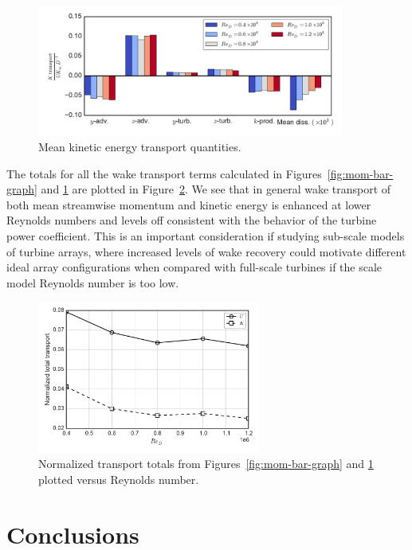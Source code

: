 \documentclass[energies,article,accept,moreauthors,pdftex,12pt,a4paper]{mdpi}
\begin{document}
\begin{figure}[ht!]
\centering
\includegraphics[width=0.9\textwidth]{figures/K_trans_bar_graph}
\caption{Mean kinetic energy transport quantities.}
\label{fig:K-bar-graph}
\end{figure}


The totals for all the wake transport terms calculated in
Figures~\ref{fig:mom-bar-graph} and \ref{fig:K-bar-graph} are plotted in
Figure~\ref{fig:wake-trans-totals}. We see that in general wake transport of
both mean streamwise momentum and kinetic energy is enhanced at lower Reynolds
numbers and levels off consistent with the behavior of the  turbine power
coefficient. This is an important consideration if studying sub-scale models of
turbine arrays, where increased levels of wake recovery could motivate different
ideal array configurations when compared with full-scale turbines if the scale
model Reynolds number is too low.

\begin{figure}[ht!]
\centering
\includegraphics[width=0.65\textwidth]{figures/wake_trans_totals}
\caption{Normalized transport totals from Figures~\ref{fig:mom-bar-graph} and
\ref{fig:K-bar-graph} plotted versus Reynolds number.}
\label{fig:wake-trans-totals}
\end{figure}


\section{Conclusions}
\end{document}
